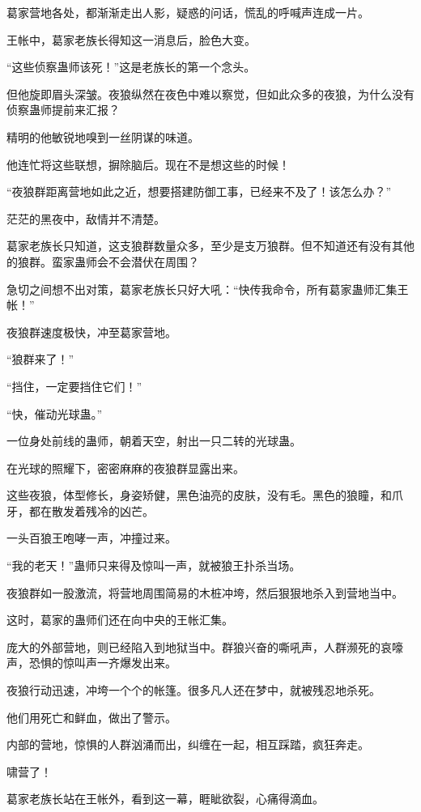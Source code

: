 \begin{this_body}
葛家营地各处，都渐渐走出人影，疑惑的问话，慌乱的呼喊声连成一片。

王帐中，葛家老族长得知这一消息后，脸色大变。

“这些侦察蛊师该死！”这是老族长的第一个念头。

但他旋即眉头深皱。夜狼纵然在夜色中难以察觉，但如此众多的夜狼，为什么没有侦察蛊师提前来汇报？

精明的他敏锐地嗅到一丝阴谋的味道。

他连忙将这些联想，摒除脑后。现在不是想这些的时候！

“夜狼群距离营地如此之近，想要搭建防御工事，已经来不及了！该怎么办？”

茫茫的黑夜中，敌情并不清楚。

葛家老族长只知道，这支狼群数量众多，至少是支万狼群。但不知道还有没有其他的狼群。蛮家蛊师会不会潜伏在周围？

急切之间想不出对策，葛家老族长只好大吼：“快传我命令，所有葛家蛊师汇集王帐！”

夜狼群速度极快，冲至葛家营地。

“狼群来了！”

“挡住，一定要挡住它们！”

“快，催动光球蛊。”

一位身处前线的蛊师，朝着天空，射出一只二转的光球蛊。

在光球的照耀下，密密麻麻的夜狼群显露出来。

这些夜狼，体型修长，身姿矫健，黑色油亮的皮肤，没有毛。黑色的狼瞳，和爪牙，都在散发着残冷的凶芒。

一头百狼王咆哮一声，冲撞过来。

“我的老天！”蛊师只来得及惊叫一声，就被狼王扑杀当场。

夜狼群如一股激流，将营地周围简易的木桩冲垮，然后狠狠地杀入到营地当中。

这时，葛家的蛊师们还在向中央的王帐汇集。

庞大的外部营地，则已经陷入到地狱当中。群狼兴奋的嘶吼声，人群濒死的哀嚎声，恐惧的惊叫声一齐爆发出来。

夜狼行动迅速，冲垮一个个的帐篷。很多凡人还在梦中，就被残忍地杀死。

他们用死亡和鲜血，做出了警示。

内部的营地，惊惧的人群汹涌而出，纠缠在一起，相互踩踏，疯狂奔走。

啸营了！

葛家老族长站在王帐外，看到这一幕，睚眦欲裂，心痛得滴血。


\end{this_body}
